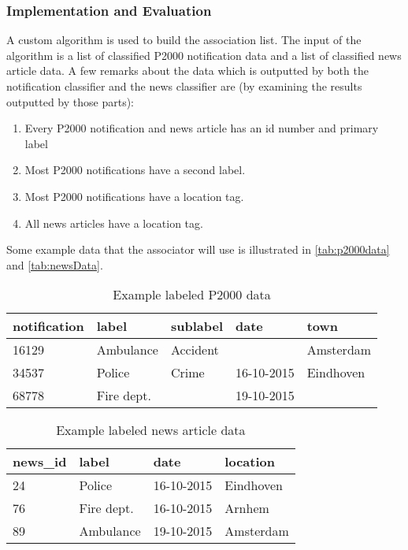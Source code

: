 \subsubsection*{Implementation and Evaluation }
A custom algorithm is used to build the association list. The input of the algorithm is a list of classified P2000 notification data and a list of classified news article data. A few remarks about the data which is outputted by both the notification classifier and the news classifier are (by examining the results outputted by those parts):
\begin{enumerate}
\item Every P2000 notification and news article has an id number and primary label
\item Most P2000 notifications have a second label. 
\item Most P2000 notifications have a location tag.
\item All news articles have a location tag.
\end{enumerate}

Some example data that the associator will use is illustrated in \autoref{tab:p2000data} and \autoref{tab:newsData}. 
\begin{table}[]
\centering
\begin{tabular}{|l|l|l|l|l|}
\hline
\textbf{notification} & \textbf{label} & \textbf{sublabel} & \textbf{date} & \textbf{town} \\ \hline
16129 & Ambulance & Accident & & Amsterdam \\ \hline
34537 & Police & Crime & 16-10-2015 & Eindhoven \\ \hline
68778 & Fire dept. & & 19-10-2015 & \\ \hline
\end{tabular}
\caption{Example labeled P2000 data}
\label{tab:p2000data}
\end{table}

\begin{table}[]
\centering
\begin{tabular}{|l|l|l|l|}
\hline
\textbf{news\_id} & \textbf{label} & \textbf{date} & \textbf{location} \\ \hline
24 & Police & 16-10-2015 & Eindhoven \\ \hline
76 & Fire dept. & 16-10-2015 & Arnhem \\ \hline
89 & Ambulance & 19-10-2015 & Amsterdam \\ \hline
\end{tabular}
\caption{Example labeled news article data}
\label{tab:newsData}
\end{table}

